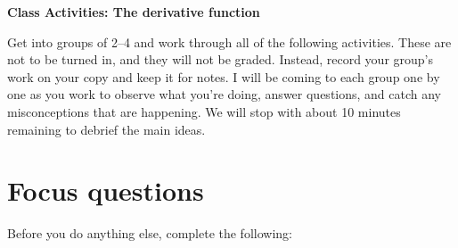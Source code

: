 \documentclass[11pt]{article}
\begin{document}
	
	\thispagestyle{empty}
	\renewcommand{\headrulewidth}{0.0pt}
	\thispagestyle{fancy}
	\lfoot{}
	\cfoot{}
	\rfoot{}	
	
	\vspace*{0in}

		\begin{center}
			\begin{large}
			\textbf{Class Activities: The derivative function} \\
			\end{large}
		\end{center}
	
Get into groups of 2--4 and work through all of the following activities. These are not to be turned in, and they will not be graded. Instead, record your group's work on your copy and keep it for notes. I will be coming to each group one by one as you work to observe what you're doing, answer questions, and catch any misconceptions that are happening. We will stop with about 10 minutes remaining to debrief the main ideas. 

\section{Focus questions}

Before you do anything else, complete the following: 
\end{document}

